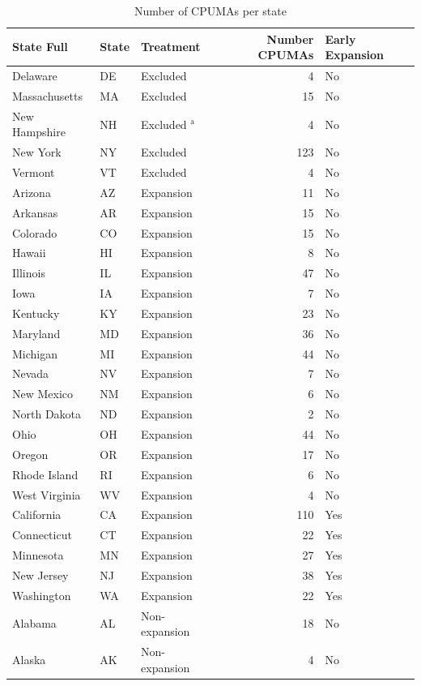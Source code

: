 \begin{table}[ht]
\centering
\caption{Number of CPUMAs per state}\label{tab:cpumasperstate}
\begin{tabular}{lllrl}
  \hline
State Full & State & Treatment & Number CPUMAs & Early Expansion \\ 
  \hline
Delaware & DE & Excluded &   4 & No \\ 
  Massachusetts & MA & Excluded &  15 & No \\ 
    New Hampshire & NH & Excluded $^\textrm{a}$ &   4 & No \\ 
  New York & NY & Excluded & 123 & No \\ 
  Vermont & VT & Excluded &   4 & No \\ 
  Arizona & AZ & Expansion &  11 & No \\ 
  Arkansas & AR & Expansion &  15 & No \\ 
  Colorado & CO & Expansion &  15 & No \\ 
  Hawaii & HI & Expansion &   8 & No \\ 
  Illinois & IL & Expansion &  47 & No \\ 
  Iowa & IA & Expansion &   7 & No \\ 
  Kentucky & KY & Expansion &  23 & No \\ 
  Maryland & MD & Expansion &  36 & No \\ 
  Michigan & MI & Expansion &  44 & No \\ 
  Nevada & NV & Expansion &   7 & No \\ 
  New Mexico & NM & Expansion &   6 & No \\ 
  North Dakota & ND & Expansion &   2 & No \\ 
  Ohio & OH & Expansion &  44 & No \\ 
  Oregon & OR & Expansion &  17 & No \\ 
  Rhode Island & RI & Expansion &   6 & No \\ 
  West Virginia & WV & Expansion &   4 & No \\ 
  California & CA & Expansion & 110 & Yes \\ 
  Connecticut & CT & Expansion &  22 & Yes \\ 
  Minnesota & MN & Expansion &  27 & Yes \\ 
  New Jersey & NJ & Expansion &  38 & Yes \\ 
  Washington & WA & Expansion &  22 & Yes \\ 
  Alabama & AL & Non-expansion &  18 & No \\ 
  Alaska & AK & Non-expansion &   4 & No \\ 

\end{tabular}
\end{table}
